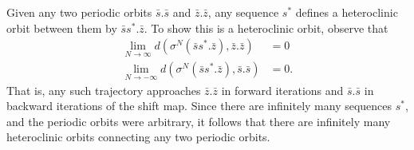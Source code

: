 \begin{solution}[7.2]
Given any two periodic orbits $\bar{s}.\bar{s}$ and $\bar{z}.\bar{z}$, any sequence $s^*$ defines a heteroclinic orbit between them by $\bar{s} s^*.\bar{z}$. To show this is a heteroclinic orbit, observe that 
\begin{align}
	\lim_{N \to \infty} d(\sigma^N (\bar{s} s^*.\bar{z}), \bar{z}.\bar{z}) &= 0 \\
	\lim_{N \to -\infty} d(\sigma^N (\bar{s} s^*.\bar{z}), \bar{s}.\bar{s}) &= 0.
\end{align}
That is, any such trajectory approaches $\bar{z}.\bar{z}$ in forward iterations and $\bar{s}.\bar{s}$ in backward iterations of the shift map. Since there are infinitely many sequences $s^*$, and the periodic orbits were arbitrary, it follows that there are infinitely many heteroclinic orbits connecting any two periodic orbits.
\end{solution}

